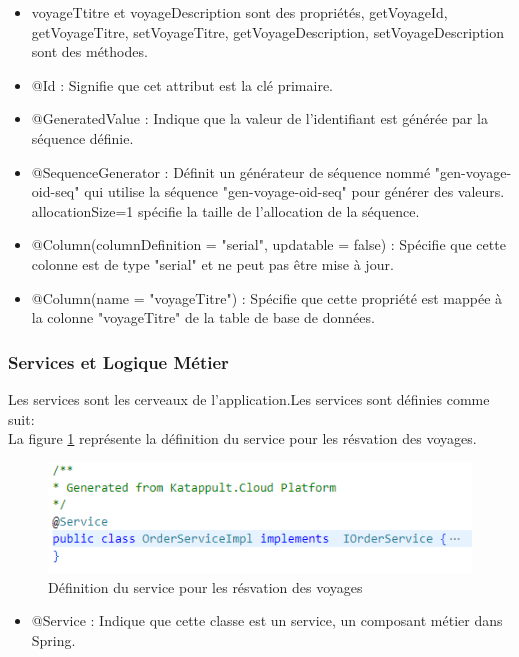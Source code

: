 \documentclass[12pt]{report}
\begin{document}
			\begin{itemize}
				\item voyageTtitre et voyageDescription sont des propriétés, getVoyageId, getVoyageTitre, setVoyageTitre, getVoyageDescription, setVoyageDescription sont des méthodes.
				\item @Id : Signifie que cet attribut est la clé primaire.
				\item @GeneratedValue : Indique que la valeur de l'identifiant est générée par la séquence définie.
				\item @SequenceGenerator : Définit un générateur de séquence nommé "gen-voyage-oid-seq" qui utilise la séquence "gen-voyage-oid-seq" pour générer des valeurs. allocationSize=1 spécifie la taille de l'allocation de la séquence.
				\item @Column(columnDefinition = "serial", updatable = false) : Spécifie que cette colonne est de type "serial" et ne peut pas être mise à jour.
				\item @Column(name = "voyageTitre") : Spécifie que cette propriété est mappée à la colonne "voyageTitre" de la table de base de données.
			\end{itemize}
			
			
			\subsubsection{Services et Logique Métier}

			\hspace{15pt} Les services sont les cerveaux de l'application.Les services sont définies comme suit:\\

			La figure \ref{fig:service} représente la définition du service pour les résvation des voyages.
			
			\begin{figure}[h]
				\centering
				\includegraphics[width=\textwidth]{service.jpg}
				\caption{Définition du service pour les résvation des voyages}
				\label{fig:service}
			\end{figure}
			\FloatBarrier

			\begin{itemize}
				\item @Service : Indique que cette classe est un service, un composant métier dans Spring.
			\end{itemize}
\end{document}
